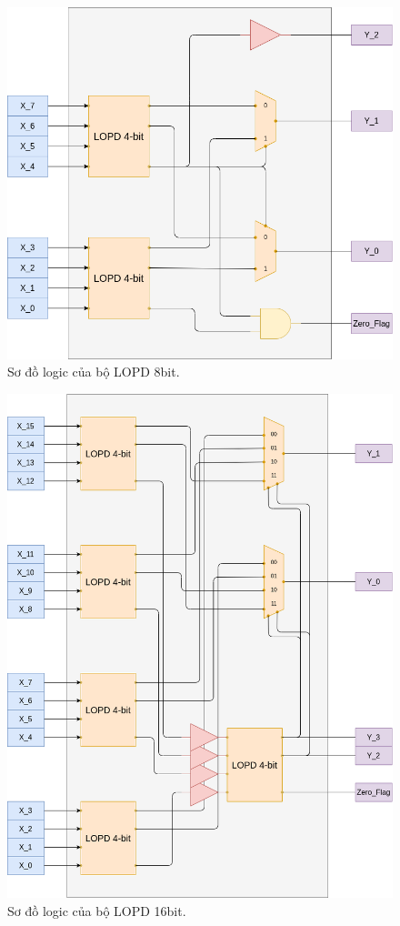 \begin{figure}[H]
	\centering
	\includegraphics[width=.8\linewidth]{./my-chapters/my-diagrams/Question2/LOPD_8bit.png}
	\caption{Sơ đồ logic của bộ LOPD 8bit.}
\end{figure}

\begin{figure}[H]
	\centering
	\includegraphics[width=.8\linewidth]{./my-chapters/my-diagrams/Question2/LOPD_16bit.png}
	\caption{Sơ đồ logic của bộ LOPD 16bit.}
\end{figure}

